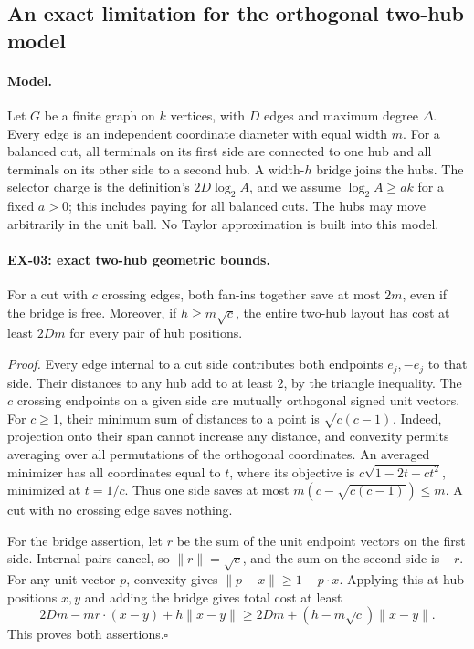 \subsection{An exact limitation for the orthogonal two-hub model}
\label{sec:ex-orthogonal}

\paragraph{Model.}
Let $G$ be a finite graph on $k$ vertices, with $D$ edges and maximum degree
$\Delta$.  Every edge is an independent coordinate diameter with equal width
$m$.  For a balanced cut, all terminals on its first side are connected to one
hub and all terminals on its other side to a second hub.  A width-$h$ bridge
joins the hubs.  The selector charge is the definition's $2D\log_2 A$, and we
assume $\log_2 A\geq ak$ for a fixed $a>0$; this includes paying for all balanced
cuts.  The hubs may move arbitrarily in the unit ball.  No Taylor approximation
is built into this model.

\paragraph{EX-03: exact two-hub geometric bounds.}
For a cut with $c$ crossing edges, both fan-ins together save at most $2m$,
even if the bridge is free.  Moreover, if $h\geq m\sqrt c$, the entire two-hub
layout has cost at least $2Dm$ for every pair of hub positions.

\emph{Proof.}
Every edge internal to a cut side contributes both endpoints $e_j,-e_j$ to
that side.  Their distances to any hub add to at least $2$, by the triangle
inequality.  The $c$ crossing endpoints on a given side are mutually orthogonal
signed unit vectors.  For $c\geq1$, their minimum sum of distances to a point
is $\sqrt{c(c-1)}$.  Indeed, projection onto their span cannot increase any
distance, and convexity permits averaging over all permutations of the
orthogonal coordinates.  An averaged minimizer has all coordinates equal to
$t$, where its objective is
$c\sqrt{1-2t+ct^2}$, minimized at $t=1/c$.  Thus one side saves at most
$m(c-\sqrt{c(c-1)})\leq m$.  A cut with no crossing edge saves nothing.

For the bridge assertion, let $r$ be the sum of the unit endpoint vectors on
the first side.  Internal pairs cancel, so $\|r\|=\sqrt c$, and the sum on the
second side is $-r$.  For any unit vector $p$, convexity gives
$\|p-x\|\geq1-p\cdot x$.  Applying this at hub positions $x,y$ and adding the
bridge gives total cost at least
\[
 2Dm-mr\cdot(x-y)+h\|x-y\|
 \geq 2Dm+(h-m\sqrt c)\|x-y\|.
\]
This proves both assertions.\hfill$\square$

